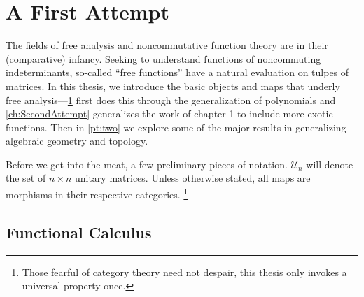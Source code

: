 \chapter{A First Attempt}\label{ch:FirstAttempt}

The fields of free analysis and noncommutative function theory are in their
(comparative) infancy. Seeking to understand functions of noncommuting
indeterminants, so-called ``free functions'' have a natural evaluation on
tulpes of matrices. In this thesis, we introduce the basic objects and maps that
underly free analysis---\cref{ch:FirstAttempt} first does this through the
generalization of polynomials and \cref{ch:SecondAttempt} generalizes the work
of chapter 1 to include more exotic functions. Then in \cref{pt:two} we explore
some of the major results in generalizing algebraic geometry and topology.


Before we get into the meat, a few preliminary pieces of notation.
\(\mathcal{U}_n\) will denote the set of \(n\times n\) unitary matrices. Unless
otherwise stated, all maps are morphisms in their respective categories.
\footnote{Those fearful of category theory need not despair, this thesis only
  invokes a universal property once.}

\section{Functional Calculus}%
\label{sec:functionalcalc}

